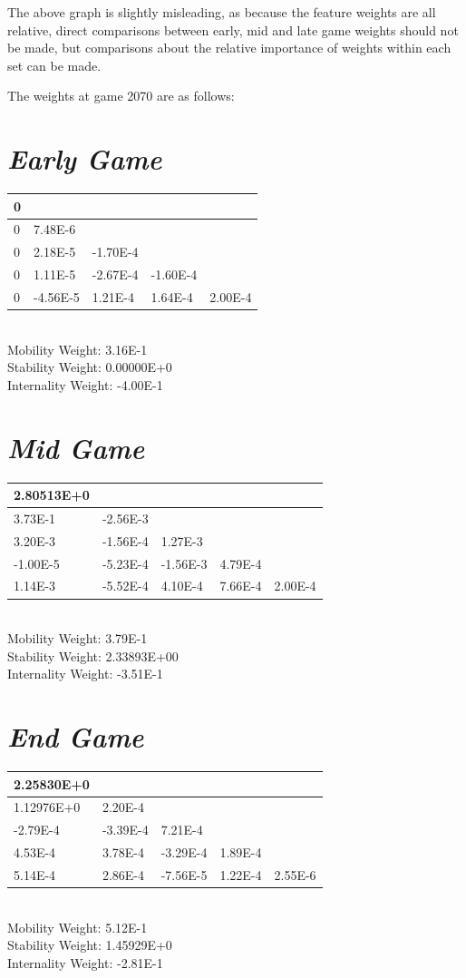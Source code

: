 \documentclass[10pt]{report}
\begin{document}
\begin{multicols}{2}
The above graph is slightly misleading, as because the feature weights are all relative, direct comparisons between early, mid and late game weights should not be made, but comparisons about the relative importance of weights within each set can be made.

The weights at game 2070 are as follows:
\section*{\emph{\textmd{Early Game}}}
\begin{tabular}{| l | l | l | l | l | }
\hline
 0&&&&\\
\hline
 0& 7.48E-6&&&\\
\hline
 0& 2.18E-5&-1.70E-4&&\\
\hline
 0& 1.11E-5&-2.67E-4&-1.60E-4&\\
\hline
 0&-4.56E-5& 1.21E-4& 1.64E-4& 2.00E-4\\
\hline
\end{tabular}
\medskip{}\\
Mobility Weight: 3.16E-1\\
Stability Weight: 0.00000E+0\\
Internality Weight: -4.00E-1
\section*{\emph{\textmd{Mid Game}}}
\begin{tabular}{| l | l | l | l | l | }
\hline
 2.80513E+0&&&&\\
\hline
 3.73E-1&-2.56E-3&&&\\
\hline
 3.20E-3&-1.56E-4& 1.27E-3&&\\
\hline
-1.00E-5&-5.23E-4&-1.56E-3& 4.79E-4&\\
\hline
 1.14E-3&-5.52E-4& 4.10E-4& 7.66E-4& 2.00E-4\\
\hline
\end{tabular}
\medskip{}\\
Mobility Weight: 3.79E-1\\
Stability Weight: 2.33893E+00\\
Internality Weight: -3.51E-1
\section*{\emph{\textmd{End Game}}}
\begin{tabular}{| l | l | l | l | l | }
\hline
 2.25830E+0&&&&\\
\hline
 1.12976E+0& 2.20E-4&&&\\
\hline
-2.79E-4&-3.39E-4& 7.21E-4&&\\
\hline
 4.53E-4& 3.78E-4&-3.29E-4& 1.89E-4&\\
\hline
 5.14E-4& 2.86E-4&-7.56E-5& 1.22E-4& 2.55E-6\\
\hline
\end{tabular}
\medskip{}\\
Mobility Weight: 5.12E-1\\
Stability Weight: 1.45929E+0\\
Internality Weight: -2.81E-1


\end{multicols}
\end{document}
